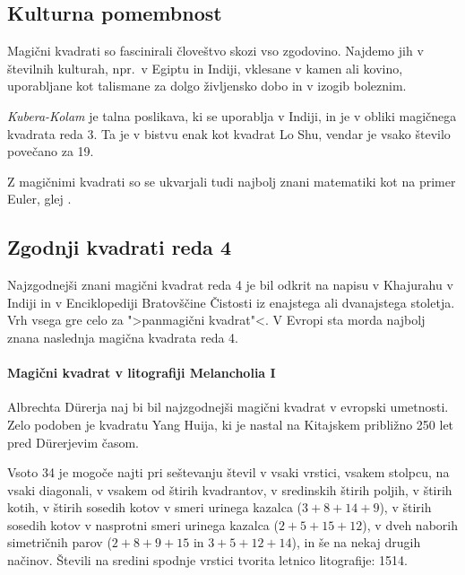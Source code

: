 \documentclass[a4paper,12pt]{article}
\begin{document}

\subsection{Kulturna pomembnost}

Magični kvadrati so fascinirali človeštvo skozi vso zgodovino. Najdemo jih
v številnih kulturah, npr.\ v Egiptu in Indiji, vklesane v kamen ali
kovino, uporabljane kot talismane za dolgo življensko dobo in v
izogib boleznim.

\emph{Kubera-Kolam} je talna poslikava, ki se uporablja v Indiji, in je v
obliki magičnega kvadrata reda 3. Ta je v bistvu enak kot kvadrat
Lo Shu, vendar je vsako število povečano za 19.

Z magičnimi kvadrati so se ukvarjali tudi najbolj znani matematiki kot na
primer Euler, glej \cite{euler}. %


\subsection{Zgodnji kvadrati reda 4}

Najzgodnejši znani magični kvadrat reda 4 je bil odkrit na napisu
v Khajurahu v Indiji in v Enciklopediji Bratovščine Čistosti iz enajstega
ali dvanajstega stoletja. Vrh vsega gre celo za ">panmagični kvadrat"<.
V Evropi sta morda najbolj znana naslednja magična kvadrata reda 4.

\paragraph{Magični kvadrat v litografiji Melancholia I}
Albrechta Dürerja naj bi bil najzgodnejši magični kvadrat
v evropski umetnosti. Zelo podoben je kvadratu Yang Huija, ki je nastal na Kitajskem
približno 250 let pred Dürerjevim časom.

Vsoto 34 je mogoče najti pri seštevanju števil v vsaki vrstici, vsakem stolpcu,
na vsaki diagonali, v vsakem od štirih kvadrantov, v sredinskih štirih poljih,
v štirih kotih, v štirih sosedih kotov v smeri urinega kazalca (\(3+8+14+9\)), v
štirih sosedih kotov v nasprotni smeri urinega kazalca (\(2+5+15+12\)), v dveh naborih
simetričnih parov (\(2+8+9+15\) in \(3+5+12+14\)), in še na nekaj drugih načinov.
Števili na sredini spodnje vrstici tvorita letnico litografije: 1514.
\end{document}
